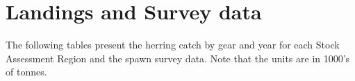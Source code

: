 
\section{Landings and Survey data}\label{Appendix::data}

The following tables present the herring catch by gear and year for each Stock Assessment Region and the spawn survey data.  Note that the units are in 1000's of tonnes.




